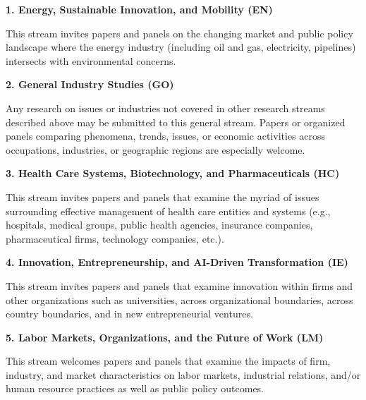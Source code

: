 \documentclass[
  10pt,
  letterpaper,
  DIV=11,
  numbers=noendperiod]{scrartcl}
\begin{document}
\noindent\textbf{\textcolor{sustainability}{1. Energy, Sustainable Innovation, and Mobility (EN)}}

\vspace{0.3em}
\noindent This stream invites papers and panels on the changing market and public policy landscape where the energy industry (including oil and gas, electricity, pipelines) intersects with environmental concerns.

\vspace{1em}

\noindent\textbf{\textcolor{gis}{2. General Industry Studies (GO)}}

\vspace{0.3em}
\noindent Any research on issues or industries not covered in other research streams described above may be submitted to this general stream. Papers or organized panels comparing phenomena, trends, issues, or economic activities across occupations, industries, or geographic regions are especially welcome.

\vspace{1em}

\noindent\textbf{\textcolor{health}{3. Health Care Systems, Biotechnology, and Pharmaceuticals (HC)}}

\vspace{0.3em}
\noindent This stream invites papers and panels that examine the myriad of issues surrounding effective management of health care entities and systems (e.g., hospitals, medical groups, public health agencies, insurance companies, pharmaceutical firms, technology companies, etc.).

\vspace{1em}

\noindent\textbf{\textcolor{innovation}{4. Innovation, Entrepreneurship, and AI-Driven Transformation (IE)}}

\vspace{0.3em}
\noindent This stream invites papers and panels that examine innovation within firms and other organizations such as universities, across organizational boundaries, across country boundaries, and in new entrepreneurial ventures.

\vspace{1em}

\noindent\textbf{\textcolor{labor}{5. Labor Markets, Organizations, and the Future of Work (LM)}}

\vspace{0.3em}
\noindent This stream welcomes papers and panels that examine the impacts of firm, industry, and market characteristics on labor markets, industrial relations, and/or human resource practices as well as public policy outcomes.
\end{document}
